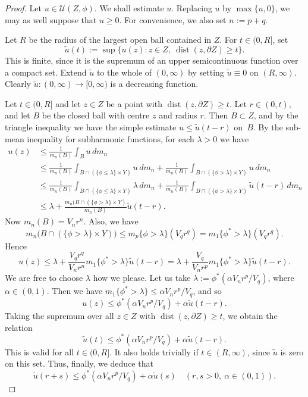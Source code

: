 \documentclass[11pt,reqno]{amsart}
\theoremstyle{plain}
\theoremstyle{definition}
\theoremstyle{remark}
\newcommand{\cU}{\mathcal{U}}
\renewcommand{\tilde}{\widetilde}
\DeclareMathOperator{\dist}{dist}
\begin{document}
\begin{proof}
Let $u\in\cU(Z,\phi)$. We shall estimate $u$.
Replacing $u$ by $\max\{u,0\}$,
we may as well suppose  that $u\ge0$.
For convenience, we also set $n:=p+q$.

Let $R$ be the radius of the largest open ball contained
in $Z$. 
For $t\in(0,R]$, set
\[
\tilde{u}(t):=\sup\{u(z):z\in Z,~\dist(z,\partial Z)\ge t\}.
\]
This is finite, since it is the supremum of an upper
semicontinuous function over a compact set.
Extend $\tilde{u}$ to the whole of $(0,\infty)$
by setting $\tilde{u}\equiv 0$ on $(R,\infty)$.
Clearly $\tilde{u}:(0,\infty)\to[0,\infty)$ is a decreasing function.

Let $t\in(0,R]$ and let $z\in Z$ be a point with
$\dist(z,\partial Z)\ge t$. Let $r\in(0,t)$, and let $B$
be the closed ball with centre $z$ and radius $r$.
Then $B\subset Z$, and by the triangle inequality
we have the simple estimate $u\le \tilde{u}(t-r)$ on~$B$.
By the sub-mean
inequality for subharmonic functions, for each $\lambda>0$ we have
\begin{align*}
u(z)
&\le \frac{1}{m_n(B)}\int_B u\,dm_n\\
&\le \frac{1}{m_n(B)}\int_{B\cap(\{\phi\le \lambda\}\times Y)}u\,dm_n
+ \frac{1}{m_n(B)}\int_{B\cap(\{\phi> \lambda\}\times Y)}u\,dm_n\\
&\le \frac{1}{m_n(B)}\int_{B\cap (\{\phi\le \lambda\}\times Y)}\lambda \,dm_n
+ \frac{1}{m_n(B)}\int_{B\cap (\{\phi> \lambda\}\times Y)}\tilde{u}(t-r)\,dm_n\\
&\le \lambda +\frac{m_n(B\cap (\{\phi>\lambda\}\times Y)}{m_n(B)}\tilde{u}(t-r).
\end{align*}
Now $m_n(B)=V_nr^n$. Also, we have
\[
m_n\bigl(B\cap (\{\phi>\lambda\}\times Y)\bigr)
\le m_p\{\phi>\lambda\}(V_qr^q)
=m_1\{\phi^*>\lambda\}(V_qr^q).
\]
Hence
\[
u(z)\le \lambda+\frac{V_q r^q}{V_nr^n}m_1\{\phi^*>\lambda\}\tilde{u}(t-r)
= \lambda+\frac{V_q}{V_nr^p}m_1\{\phi^*>\lambda\}\tilde{u}(t-r).
\]
We are free to choose $\lambda$ how we please.
Let us take $\lambda:=\phi^*(\alpha V_nr^p/V_q)$, where $\alpha\in(0,1)$.
Then we have
$m_1\{\phi^*>\lambda\}\le \alpha V_nr^p/V_q$, and so
\[
u(z)\le \phi^*(\alpha V_nr^p/V_q)+\alpha \tilde{u}(t-r).
\]
Taking the supremum over all $z\in Z$ with
$\dist(z,\partial Z)\ge t$, we obtain the relation
\[
\tilde{u}(t)\le \phi^*(\alpha V_nr^p/V_q)+\alpha \tilde{u}(t-r).
\]
This is valid for all $t\in(0,R]$. 
It also holds trivially if $t\in(R,\infty)$,
since $\tilde{u}$ is zero on this set.
Thus, finally, we deduce that
\begin{equation}\label{E:relation}
\tilde{u}(r+s)\le \phi^*(\alpha V_nr^p/V_q)+\alpha \tilde{u}(s)
\quad(r,s>0,~\alpha\in(0,1)).
\end{equation}



\end{proof}
\end{document}
